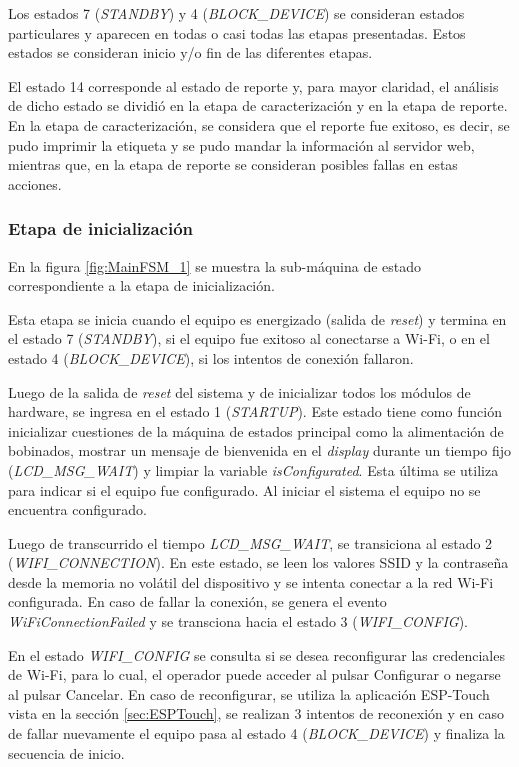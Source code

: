 Los estados 7 (\textit{STANDBY}) y 4 (\textit{BLOCK\_DEVICE}) se consideran estados particulares y aparecen en todas o casi todas las etapas presentadas. Estos estados se consideran inicio y/o fin de las diferentes etapas.

El estado 14 corresponde al estado de reporte y, para mayor claridad, el análisis de dicho estado se dividió en la etapa de caracterización y en la etapa de reporte. En la etapa de caracterización, se considera que el reporte fue exitoso, es decir, se pudo imprimir la etiqueta y se pudo mandar la información al servidor web, mientras que, en la etapa de reporte se consideran posibles fallas en estas acciones.

\subsubsection{Etapa de inicialización}
\label{subsubsec:EtIni}
En la figura \ref{fig:MainFSM_1} se muestra la sub-máquina de estado correspondiente a la etapa de inicialización. 

Esta etapa se inicia cuando el equipo es energizado (salida de \textit{reset}) y termina en el estado 7 (\textit{STANDBY}), si el equipo fue exitoso al conectarse a Wi-Fi, o en el estado  4 (\textit{BLOCK\_DEVICE}), si los intentos de conexión fallaron. 

Luego de la salida de \textit{reset} del sistema y de inicializar todos los módulos de hardware, se ingresa en el estado 1 (\textit{STARTUP}). Este estado tiene como función inicializar cuestiones de la máquina de estados principal como la alimentación de bobinados, mostrar un mensaje de bienvenida en el \textit{display} durante un tiempo fijo (\textit{LCD\_MSG\_WAIT}) y limpiar la variable \textit{isConfigurated}. Esta última se utiliza para indicar si el equipo fue configurado. Al iniciar el sistema el equipo no se encuentra configurado.

Luego de transcurrido el tiempo \textit{LCD\_MSG\_WAIT}, se transiciona al estado 2 (\textit{WIFI\_CONNECTION}). En este estado, se leen los valores SSID y la contraseña desde la memoria no volátil del dispositivo y se intenta conectar a la red Wi-Fi configurada. En caso de fallar la conexión, se genera el evento \textit{WiFiConnectionFailed} y se transciona hacia el estado 3 (\textit{WIFI\_CONFIG}). 

En el estado \textit{WIFI\_CONFIG} se consulta si se desea reconfigurar las credenciales de Wi-Fi, para lo cual, el operador puede acceder al pulsar Configurar o negarse al pulsar Cancelar. En caso de reconfigurar, se utiliza la aplicación ESP-Touch vista en la sección \ref{sec:ESPTouch}, se realizan 3 intentos de reconexión y en caso de fallar nuevamente el equipo pasa al estado 4 (\textit{BLOCK\_DEVICE}) y finaliza la secuencia de inicio.

